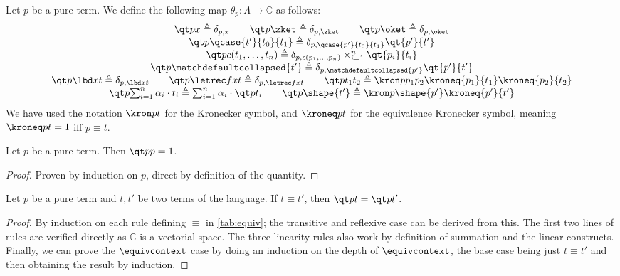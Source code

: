 \begin{definition}\label{def:quantity}
  Let $p$ be a pure term.
  We define the following map $\theta_p : \Lambda \to \mathbb C$ as follows:
  \begingroup
  \renewcommand{\arraystretch}{1.5}
  \[
    \begin{array}{c}
      \qt p x \triangleq \delta_{p, x} \qquad \qt p \zket \triangleq
      \delta_{p, \zket}
      \qquad \qt p \oket \triangleq \delta_{p, \oket} \\
      \qt p {\qcase {t'} {t_0} {t_1}} \triangleq \delta_{p,
      \qcase{p'}{t_0}{t_1}} \qt{p'}{t'} \\
      \qt p {c(t_1, \dots, t_n)} \triangleq \delta_{p, c(p_1, \dots, p_n)}
      \times_{i=1}^n \qt{p_i}{t_i} \\
      \qt p {\matchdefaultcollapsed{t'}} \triangleq
      \delta_{p, \matchdefaultcollapsed{p'}} \qt{p'}{t'} \\
      \qt p {\lbd x t} \triangleq \delta_{p, \lbd x t} \qquad \qt p {\letrec f
      x t} \triangleq \delta_{p, \letrec f x t} \qquad
      \qt p {t_1t_2} \triangleq \kron p {p_1p_2} \kroneq {p_1} {t_1} \kroneq
      {p_2} {t_2}  \\
      \qt p {\sum_{i=1}^n \alpha_i \cdot t_i} \triangleq
      \sum_{i=1}^n \alpha_i
      \cdot \qt p {t_i}
      \qquad \qt p {\shape{t'}} \triangleq \kron p {\shape{p'}}
      \kroneq {p'} {t'}
    \end{array}
  \]
  \endgroup
  We have used the notation $\kron p t$ for the Kronecker symbol,
  and $\kroneq p t$ for the equivalence Kronecker symbol, meaning
  $\kroneq p t = 1$ iff $p \equiv t$.
\end{definition}

\begin{lemma}\label{lem:quantity-one}
  Let $p$ be a pure term.
  Then $\qt p p = 1$.
\end{lemma}

\begin{proof}
  Proven by induction on $p$, direct by definition of the quantity. \qedhere
\end{proof}

\begin{lemma}\label{lem:quantity-equiv}
  Let $p$ be a pure term and $t, t'$ be two terms of the language.
  If $t \equiv t'$, then $\qt p t = \qt p {t'}$.
\end{lemma}

\begin{proof}
  By induction on each rule defining $\equiv$ in \autoref{tab:equiv};
  the transitive and reflexive case can be derived from this.
  The first two lines of rules are verified directly as $\mathbb C$
  is a vectorial space.
  The three linearity rules also work by definition of summation and
  the linear constructs.
  Finally, we can prove the $\equivcontext$ case by doing an
  induction on the depth of $\equivcontext$,
  the base case being just $t \equiv t'$ and then obtaining the
  result by induction. \qedhere
\end{proof}

